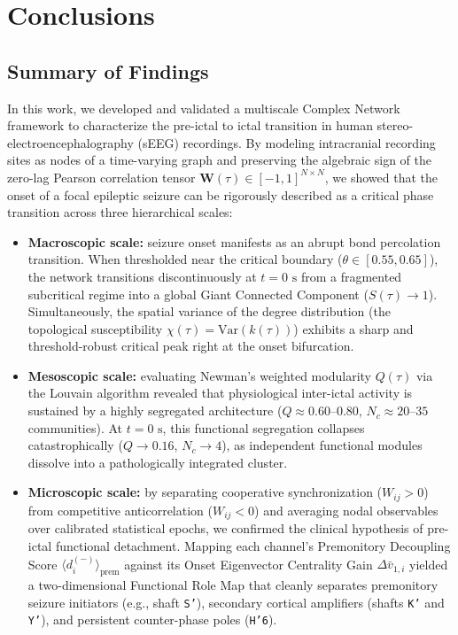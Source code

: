 \chapter{Conclusions}
\label{chap:conclusions}

\section{Summary of Findings}
\label{sec:summary}

In this work, we developed and validated a multiscale Complex Network framework to characterize the pre-ictal to ictal transition in human stereo-electroencephalography (sEEG) recordings. By modeling intracranial recording sites as nodes of a time-varying graph and preserving the algebraic sign of the zero-lag Pearson correlation tensor $\mathbf{W}(\tau) \in [-1, 1]^{N \times N}$, we showed that the onset of a focal epileptic seizure can be rigorously described as a critical phase transition across three hierarchical scales:

\begin{itemize}
    \item \textbf{Macroscopic scale:} seizure onset manifests as an abrupt bond percolation transition. When thresholded near the critical boundary ($\theta \in [0.55, 0.65]$), the network transitions discontinuously at $t = 0\text{ s}$ from a fragmented subcritical regime into a global Giant Connected Component ($S(\tau) \to 1$). Simultaneously, the spatial variance of the degree distribution (the topological susceptibility $\chi(\tau) = \text{Var}(k(\tau))$) exhibits a sharp and threshold-robust critical peak right at the onset bifurcation.
    \item \textbf{Mesoscopic scale:} evaluating Newman's weighted modularity $Q(\tau)$ via the Louvain algorithm revealed that physiological inter-ictal activity is sustained by a highly segregated architecture ($Q \approx 0.60\text{--}0.80$, $N_c \approx 20\text{--}35$ communities). At $t = 0\text{ s}$, this functional segregation collapses catastrophically ($Q \to 0.16$, $N_c \to 4$), as independent functional modules dissolve into a pathologically integrated cluster.
    \item \textbf{Microscopic scale:} by separating cooperative synchronization ($W_{ij} > 0$) from competitive anticorrelation ($W_{ij} < 0$) and averaging nodal observables over calibrated statistical epochs, we confirmed the clinical hypothesis of pre-ictal functional detachment. Mapping each channel's Premonitory Decoupling Score $\langle d_i^{(-)}\rangle_{\text{prem}}$ against its Onset Eigenvector Centrality Gain $\Delta \bar{v}_{1,i}$ yielded a two-dimensional Functional Role Map that cleanly separates premonitory seizure initiators (e.g., shaft \texttt{S'}), secondary cortical amplifiers (shafts \texttt{K'} and \texttt{Y'}), and persistent counter-phase poles (\texttt{H'6}).
\end{itemize}

